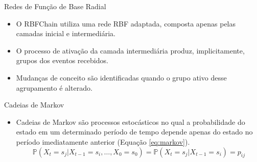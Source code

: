 \documentclass[10pt]{beamer}
\begin{document}
\begin{frame}{Redes de Função de Base Radial}
    \begin{itemize}
        \item<1 -> O RBFChain utiliza uma rede RBF adaptada, composta apenas pelas camadas inicial e intermediária.
        \item<1 -> O processo de ativação da camada intermediária produz, implicitamente, grupos dos eventos recebidos.
        \item<1 -> Mudanças de conceito são identificadas quando o grupo ativo desse agrupamento é alterado.
      \end{itemize}
\end{frame}



\begin{frame}{Cadeias de Markov}
    \begin{itemize}
        \item<1 -> \alert{Cadeias de Markov} são processos estocásticos no qual a probabilidade do estado em um determinado período de tempo depende apenas do estado no período imediatamente anterior (Equação \ref{eq:markov}).
        \begin{equation}
            \label{eq:markov}
            \mathbb { P } \left( X _ { t } = s _ { j } | X _ { t - 1 } = s _ { i } , \ldots , X _ { 0 } = s _ { 0 } \right) = \mathbb { P } \left( X _ { t } = s _ { j } | X _ { t - 1 } = s _ { i } \right) = p _ { i j }
        \end{equation}
      \end{itemize}
\end{frame}
\end{document}
